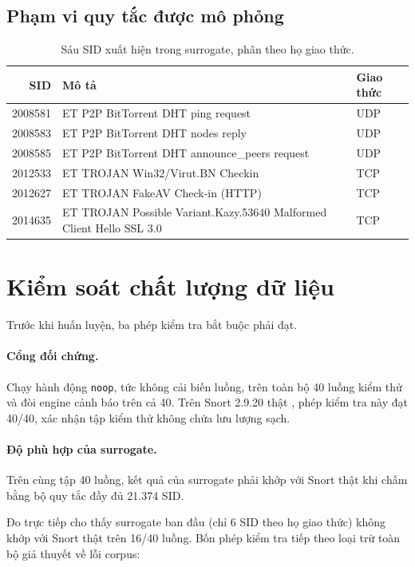 \documentclass[12pt, a4paper, openany]{book}
\begin{document}
\subsection{Phạm vi quy tắc được mô phỏng}

\begin{table}[htbp]
\centering
\caption{Sáu SID xuất hiện trong surrogate, phân theo họ giao thức.}
\label{tab:sids}
\begin{tabular}{rll}
\toprule
SID & Mô tả & Giao thức \\
\midrule
2008581 & ET P2P BitTorrent DHT ping request & UDP \\
2008583 & ET P2P BitTorrent DHT nodes reply & UDP \\
2008585 & ET P2P BitTorrent DHT announce\_peers request & UDP \\
2012533 & ET TROJAN Win32/Virut.BN Checkin & TCP \\
2012627 & ET TROJAN FakeAV Check-in (HTTP) & TCP \\
2014635 & ET TROJAN Possible Variant.Kazy.53640 Malformed Client Hello SSL 3.0 & TCP \\
\bottomrule
\end{tabular}
\end{table}

\section{Kiểm soát chất lượng dữ liệu}
\label{sec:quality}

Trước khi huấn luyện, ba phép kiểm tra bắt buộc phải đạt.

\paragraph{Cổng đối chứng.} Chạy hành động \texttt{noop}, tức không cải biến luồng, trên toàn bộ 40 luồng kiểm thử và đòi engine cảnh báo trên cả 40. Trên Snort 2.9.20 thật \cite{snort2009}, phép kiểm tra này đạt 40/40, xác nhận tập kiểm thử không chứa lưu lượng sạch.

\paragraph{Độ phù hợp của surrogate.} Trên cùng tập 40 luồng, kết quả của surrogate phải khớp với Snort thật khi chấm bằng bộ quy tắc đầy đủ 21.374 SID.

Đo trực tiếp cho thấy surrogate ban đầu (chỉ 6 SID theo họ giao thức) không khớp với Snort thật trên 16/40 luồng. Bốn phép kiểm tra tiếp theo loại trừ toàn bộ giả thuyết về lỗi corpus:
\end{document}
